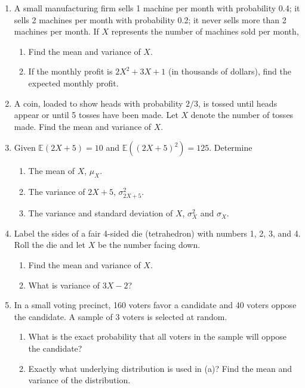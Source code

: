 \documentclass[12pt]{article}
\begin{document}
\begin{enumerate}
  \item A small manufacturing firm sells 1 machine per month with probability 0.4; it sells 2 machines per month with probability 0.2; it never sells more than 2 machines per month. If $X$ represents the number of machines sold per month,
    \begin{enumerate}[label=(\alph*)]
      \item Find the mean and variance of $X$.
      \item If the monthly profit is $2X^2 + 3X + 1$ (in thousands of dollars), find the expected monthly profit.
    \end{enumerate}

\newpage

  \item A coin, loaded to show heads with probability $2/3$, is tossed until heads appear or until 5 tosses have been made. Let $X$ denote the number of tosses made. Find the mean and variance of $X$.

\newpage

  \item Given $\mathbb{E}(2X + 5) = 10$ and $\mathbb{E}\!\left((2X + 5)^2\right) = 125$. Determine
    \begin{enumerate}[label=(\alph*)]
      \item The mean of $X$, $\mu_X$.
      \item The variance of $2X + 5$, $\sigma_{2X+5}^2$.
      \item The variance and standard deviation of $X$, $\sigma_X^2$ and $\sigma_X$.
    \end{enumerate}

\newpage

  \item Label the sides of a fair 4-sided die (tetrahedron) with numbers 1, 2, 3, and 4. Roll the die and let $X$ be the number facing down.
    \begin{enumerate}[label=(\alph*)]
      \item Find the mean and variance of $X$.
      \item What is variance of $3X - 2$?
    \end{enumerate}

\newpage

  \item In a small voting precinct, 160 voters favor a candidate and 40 voters oppose the candidate. A sample of 3 voters is selected at random.
    \begin{enumerate}[label=(\alph*)]
      \item What is the exact probability that all voters in the sample will oppose the candidate?
      \item Exactly what underlying distribution is used in (a)? Find the mean and variance of the distribution.
    \end{enumerate}


\end{enumerate}
\end{document}
